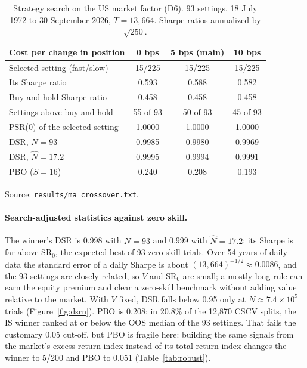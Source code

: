 \documentclass[11pt,a4paper]{article}
\newcommand{\SR}{\mathrm{SR}}
\begin{document}
\begin{table}[htbp]
\centering\small
\begin{threeparttable}
\caption{Strategy search on the US market factor (D6). 93 settings, 18 July 1972 to 30 September 2026, $T=13{,}664$. Sharpe ratios annualized by $\sqrt{250}$.}\label{tab:case}
\begin{tabular}{@{}lccc@{}}
\toprule
Cost per change in position & 0 bps & 5 bps (main) & 10 bps \\
\midrule
Selected setting (fast/slow) & 15/225 & 15/225 & 15/225 \\
Its Sharpe ratio & 0.593 & 0.588 & 0.582 \\
Buy-and-hold Sharpe ratio & 0.458 & 0.458 & 0.458 \\
Settings above buy-and-hold & 55 of 93 & 50 of 93 & 45 of 93 \\
PSR(0) of the selected setting & 1.0000 & 1.0000 & 1.0000 \\
DSR, $N=93$ & 0.9985 & 0.9980 & 0.9969 \\
DSR, $\hat N=17.2$ & 0.9995 & 0.9994 & 0.9991 \\
PBO ($S=16$) & 0.240 & 0.208 & 0.193 \\
\bottomrule
\end{tabular}
\begin{tablenotes}\footnotesize
\item Source: \texttt{results/ma\_crossover.txt}.
\end{tablenotes}
\end{threeparttable}
\end{table}

\paragraph{Search-adjusted statistics against zero skill.} The winner's DSR is 0.998 with $N=93$ and 0.999 with $\hat N=17.2$: its Sharpe is far above $\SR_0$, the expected best of 93 zero-skill trials. Over 54 years of daily data the standard error of a daily Sharpe is about $(13{,}664)^{-1/2}\approx0.0086$, and the 93 settings are closely related, so $V$ and $\SR_0$ are small; a mostly-long rule can earn the equity premium and clear a zero-skill benchmark without adding value relative to the market. With $V$ fixed, DSR falls below 0.95 only at $N\approx7.4\times10^5$ trials (Figure~\ref{fig:dsrn}). PBO is 0.208: in 20.8\% of the 12,870 CSCV splits, the IS winner ranked at or below the OOS median of the 93 settings. That fails the customary 0.05 cut-off, but PBO is fragile here: building the same signals from the market's excess-return index instead of its total-return index changes the winner to 5/200 and PBO to 0.051 (Table~\ref{tab:robust}).
\end{document}
